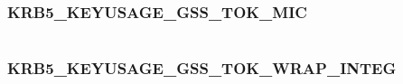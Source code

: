 \documentclass[letterpaper,10pt,english]{sphinxmanual}
\begin{document}
\begin{fulllineitems}
\label{appdev/refs/macros/KRB5_KEYUSAGE_FAST_REQ_CHKSUM:KRB5_KEYUSAGE_FAST_REQ_CHKSUM}
\end{fulllineitems}


\begin{tabulary}{\linewidth}{|L|L|}
\hline

 & 
\\\hline
\end{tabulary}



\subsubsection{KRB5\_KEYUSAGE\_GSS\_TOK\_MIC}
\label{appdev/refs/macros/KRB5_KEYUSAGE_GSS_TOK_MIC:krb5-keyusage-gss-tok-mic}\label{appdev/refs/macros/KRB5_KEYUSAGE_GSS_TOK_MIC::doc}\label{appdev/refs/macros/KRB5_KEYUSAGE_GSS_TOK_MIC:krb5-keyusage-gss-tok-mic-data}

\begin{fulllineitems}
\label{appdev/refs/macros/KRB5_KEYUSAGE_GSS_TOK_MIC:KRB5_KEYUSAGE_GSS_TOK_MIC}
\end{fulllineitems}


\begin{tabulary}{\linewidth}{|L|L|}
\hline

 & 
\\\hline
\end{tabulary}



\subsubsection{KRB5\_KEYUSAGE\_GSS\_TOK\_WRAP\_INTEG}
\label{appdev/refs/macros/KRB5_KEYUSAGE_GSS_TOK_WRAP_INTEG::doc}\label{appdev/refs/macros/KRB5_KEYUSAGE_GSS_TOK_WRAP_INTEG:krb5-keyusage-gss-tok-wrap-integ}\label{appdev/refs/macros/KRB5_KEYUSAGE_GSS_TOK_WRAP_INTEG:krb5-keyusage-gss-tok-wrap-integ-data}

\begin{fulllineitems}
\label{appdev/refs/macros/KRB5_KEYUSAGE_GSS_TOK_WRAP_INTEG:KRB5_KEYUSAGE_GSS_TOK_WRAP_INTEG}
\end{fulllineitems}
\end{document}
